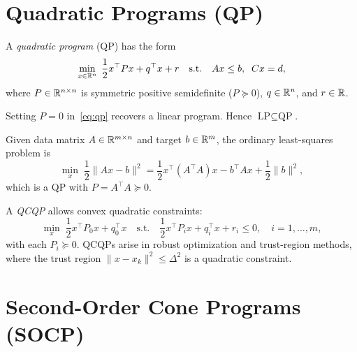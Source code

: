 \documentclass[11pt,a4paper]{article}
\begin{document}
\section{Quadratic Programs (QP)}\label{sec:qp}

\begin{definition}\label{def:qp}
A \emph{quadratic program} (QP) has the form
\begin{equation}\label{eq:qp}
  \min_{x \in \mathbb{R}^n} \; \frac{1}{2} x^\top P x + q^\top x + r \quad
  \text{s.t.} \quad Ax \le b, \;\; Cx = d,
\end{equation}
where $P \in \mathbb{R}^{n \times n}$ is symmetric positive semidefinite
($P \succeq 0$), $q \in \mathbb{R}^n$, and $r \in \mathbb{R}$.
\end{definition}

\begin{remark}\label{rem:qp-contains-lp}
Setting $P = 0$ in~\eqref{eq:qp} recovers a linear program. Hence
$\text{LP} \subseteq \text{QP}$.
\end{remark}

\begin{example}\label{ex:ls}
Given data matrix $A \in \mathbb{R}^{m \times n}$ and target $b \in \mathbb{R}^m$, the
ordinary least-squares problem is
\[
  \min_{x} \; \frac{1}{2}\|Ax - b\|^2 = \frac{1}{2}x^\top(A^\top A) x
  - b^\top A x + \frac{1}{2}\|b\|^2,
\]
which is a QP with $P = A^\top A \succeq 0$.
\end{example}

\begin{example}\label{ex:qcqp}
A \emph{QCQP} allows convex quadratic constraints:
\[
  \min_{x} \; \frac{1}{2}x^\top P_0 x + q_0^\top x \quad \text{s.t.} \quad
  \frac{1}{2}x^\top P_i x + q_i^\top x + r_i \le 0, \quad i = 1,\dots,m,
\]
with each $P_i \succeq 0$. QCQPs arise in robust optimization and trust-region
methods, where the trust region $\|x - x_k\|^2 \le \Delta^2$ is a quadratic
constraint.
\end{example}


\section{Second-Order Cone Programs (SOCP)}\label{sec:socp}
\end{document}
